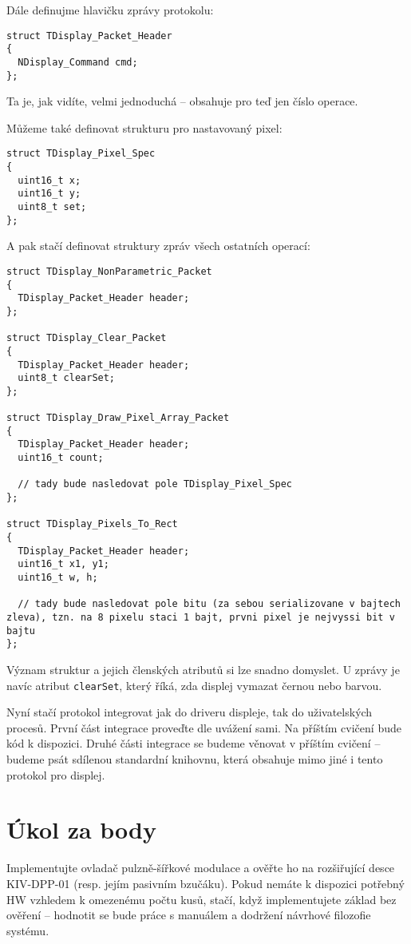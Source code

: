 \documentclass{article}
\begin{document}
Dále definujme hlavičku zprávy protokolu:
\begin{lstlisting}
struct TDisplay_Packet_Header
{
  NDisplay_Command cmd;
};
\end{lstlisting}
Ta je, jak vidíte, velmi jednoduchá -- obsahuje pro teď jen číslo operace.

Můžeme také definovat strukturu pro nastavovaný pixel:
\begin{lstlisting}
struct TDisplay_Pixel_Spec
{
  uint16_t x;
  uint16_t y;
  uint8_t set;
};
\end{lstlisting}

A pak stačí definovat struktury zpráv všech ostatních operací:
\begin{lstlisting}
struct TDisplay_NonParametric_Packet
{
  TDisplay_Packet_Header header;
};

struct TDisplay_Clear_Packet
{
  TDisplay_Packet_Header header;
  uint8_t clearSet;
};

struct TDisplay_Draw_Pixel_Array_Packet
{
  TDisplay_Packet_Header header;
  uint16_t count;
	
  // tady bude nasledovat pole TDisplay_Pixel_Spec
};

struct TDisplay_Pixels_To_Rect
{
  TDisplay_Packet_Header header;
  uint16_t x1, y1;
  uint16_t w, h;
	
  // tady bude nasledovat pole bitu (za sebou serializovane v bajtech zleva), tzn. na 8 pixelu staci 1 bajt, prvni pixel je nejvyssi bit v bajtu
};
\end{lstlisting}
Význam struktur a jejich členských atributů si lze snadno domyslet. U  zprávy je navíc atribut \texttt{clearSet}, který říká, zda displej vymazat černou nebo  barvou.

Nyní stačí protokol integrovat jak do driveru displeje, tak do uživatelských procesů. První část integrace proveďte dle uvážení sami. Na příštím cvičení bude kód k dispozici. Druhé části integrace se budeme věnovat v příštím cvičení -- budeme psát sdílenou standardní knihovnu, která obsahuje mimo jiné i tento protokol pro displej.

\section{Úkol za body}

Implementujte ovladač pulzně-šířkové modulace a ověřte ho na rozšiřující desce KIV-DPP-01 (resp. jejím pasivním bzučáku). Pokud nemáte k dispozici potřebný HW vzhledem k omezenému počtu kusů, stačí, když implementujete základ bez ověření -- hodnotit se bude práce s manuálem a dodržení návrhové filozofie systému.
\end{document}
